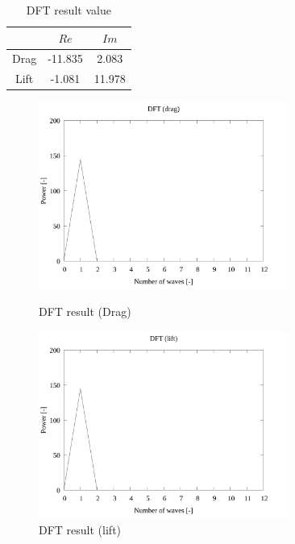 \documentclass[twocolumn,a4j]{jsarticle}
\begin{document}
\begin{table}[htbp]
    \begin{center}
        \caption{DFT result value}
        \begin{tabular}{|p{30mm}|p{20mm}|p{20mm}|}
            \hline
            \multicolumn{1}{|c|}{}     & \multicolumn{1}{|c|}{$Re$}    & \multicolumn{1}{|c|}{$Im$}   \\ \hline
            \multicolumn{1}{|c|}{Drag} & \multicolumn{1}{|c|}{-11.835} & \multicolumn{1}{|c|}{2.083}  \\ \hline
            \multicolumn{1}{|c|}{Lift} & \multicolumn{1}{|c|}{-1.081}  & \multicolumn{1}{|c|}{11.978} \\ \hline
        \end{tabular}
    \end{center}
\end{table}

\newpage
\begin{figure}[htbp]
    \begin{center}
        \includegraphics[width=82mm]{../../../02_workspace/result/simulation_tx=10.0_ty=-5.0_dx=5.00_dy=-2.50/plot/07/07-3_dft-drag.png}
        \caption{DFT result (Drag)}
        \includegraphics[width=82mm]{../../../02_workspace/result/simulation_tx=10.0_ty=-5.0_dx=5.00_dy=-2.50/plot/07/07-4_dft-lift.png}
        \caption{DFT result (lift)}
    \end{center}
\end{figure}
\end{document}
